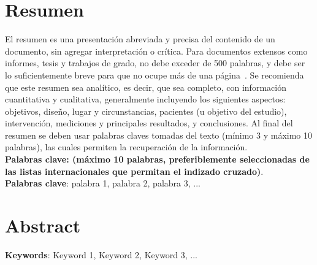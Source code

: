 \section*{Resumen}

El resumen es una presentación abreviada y precisa del contenido de un documento, sin agregar interpretación o crítica. Para documentos extensos como informes, tesis y trabajos de grado, no debe exceder de 500 palabras, y debe ser lo suficientemente breve para que no ocupe más de una página~\cite{NTC14862008}. Se recomienda que este resumen sea analítico, es decir, que sea completo, con información cuantitativa y cualitativa, generalmente incluyendo los siguientes aspectos: objetivos, diseño, lugar y circunstancias, pacientes (u objetivo del estudio), intervención, mediciones y principales resultados, y conclusiones. Al final del resumen se deben usar palabras claves tomadas del texto (mínimo 3 y máximo 10 palabras), las cuales permiten la recuperación de la información.\\

\textbf{\small Palabras clave: (máximo 10 palabras, preferiblemente seleccionadas de las listas internacionales que permitan el indizado cruzado)}.\\

\textbf{Palabras clave}: palabra 1, palabra 2, palabra 3, ...

\newpage
\section*{Abstract}

\textbf{Keywords}: Keyword 1, Keyword 2, Keyword 3, ...


